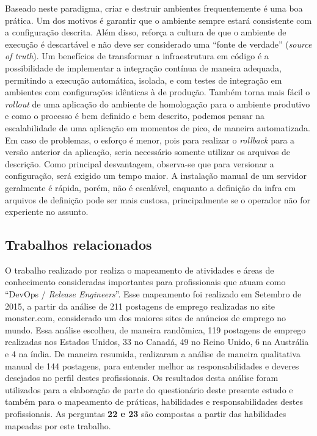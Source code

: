 \documentclass[twoside,english,brazilian]{UNISINOSartigo}
\begin{document}
Baseado neste paradigma, criar e destruir ambientes frequentemente é uma boa prática. Um dos motivos é garantir que o ambiente sempre estará consistente com a configuração descrita. Além disso, reforça a cultura de que o ambiente de execução é descartável e não deve ser considerado uma ``fonte de verdade'' (\textit{source of truth}).
Um benefícios de transformar a infraestrutura em código é a possibilidade de implementar a integração contínua de maneira adequada, permitindo a execução automática, isolada, e com testes de integração em ambientes com configurações idênticas à de produção. Também torna mais fácil o \textit{rollout} de uma aplicação do ambiente de homologação para o ambiente produtivo e como o processo é bem definido e bem descrito, podemos pensar na escalabilidade de uma aplicação em momentos de pico, de maneira automatizada. Em caso de problemas, o esforço é menor, pois para realizar o \textit{rollback} para a versão anterior da aplicação, seria necessário somente utilizar os arquivos de descrição. Como principal desvantagem, observa-se que para versionar a configuração, será exigido um tempo maior. A instalação manual de um servidor geralmente é rápida, porém, não é escalável, enquanto a definição da infra em arquivos de definição pode ser mais custosa, principalmente se o operador não for experiente no assunto.

\subsection{Trabalhos relacionados}
O trabalho realizado por  realiza o mapeamento de atividades e áreas de conhecimento consideradas importantes para profissionais que atuam como ``DevOps / \textit{Release Engineers}''. Esse mapeamento foi realizado em Setembro de 2015, a partir da análise de 211 postagens de emprego realizadas no site monster.com, considerado um dos maiores sites de anúncios de emprego no mundo. Essa análise escolheu, de maneira randômica, 119 postagens de emprego realizadas nos Estados Unidos, 33 no Canadá, 49 no Reino Unido, 6 na Austrália e 4 na índia.  De maneira resumida,  realizaram a análise de maneira qualitativa manual de 144 postagens, para entender melhor as responsabilidades e deveres desejados no perfil destes profissionais. Os resultados desta análise foram utilizados para a elaboração de parte do questionário deste presente estudo e também para o mapeamento de práticas, habilidades e responsabilidades destes profissionais. As perguntas \textbf{22 e 23} são compostas a partir das habilidades mapeadas por este trabalho.
\end{document}
